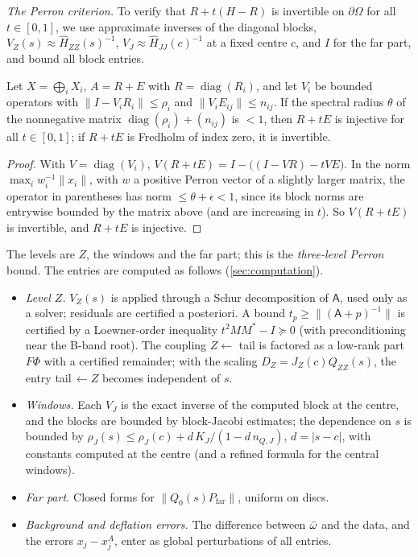 \emph{The Perron criterion.} To verify that $R+t(H-R)$ is invertible on $\partial\Omega$ for all $t\in[0,1]$, we
use approximate inverses of the diagonal blocks, $V_Z(s)\approx\widehat H_{ZZ}(s)^{-1}$, $V_J\approx\widehat
H_{JJ}(c)^{-1}$ at a fixed centre $c$, and $I$ for the far part, and bound all block entries.

\begin{lemma}\label{lem:perron}
Let $X=\bigoplus_iX_i$, $A=R+E$ with $R=\operatorname{diag}(R_i)$, and let $V_i$ be bounded operators with
$\|I-V_iR_i\|\le\rho_i$ and $\|V_iE_{ij}\|\le n_{ij}$. If the spectral radius $\theta$ of the nonnegative matrix
$\operatorname{diag}(\rho_i)+(n_{ij})$ is $<1$, then $R+tE$ is injective for all $t\in[0,1]$; if $R+tE$ is Fredholm of
index zero, it is invertible.
\end{lemma}

\begin{proof}
With $V=\operatorname{diag}(V_i)$, $V(R+tE)=I-\big((I-VR)-tVE\big)$. In the norm
$\max_iw_i^{-1}\|x_i\|$, with $w$ a positive Perron vector of a slightly larger matrix, the operator in
parentheses has norm $\le\theta+\epsilon<1$, since its block norms are entrywise bounded by the matrix above
(and are increasing in $t$). So $V(R+tE)$ is invertible, and $R+tE$ is injective.
\end{proof}

The levels are $Z$, the windows and the far part; this is the \emph{three-level Perron} bound. The entries are
computed as follows (\cref{sec:computation}).
\begin{itemize}[leftmargin=*]
\item \emph{Level $Z$.} $V_Z(s)$ is applied through a Schur decomposition of $\mathsf A$, used
  only as a solver; residuals are certified a posteriori. A bound $t_p\ge\|(\mathsf A+p)^{-1}\|$ is certified by a Loewner-order inequality $t^2MM^*-I\succeq0$ (with preconditioning near the
  B-band root). The coupling $Z\leftarrow$ tail is factored as a low-rank part $F\Phi$ with a certified
  remainder; with the scaling $D_Z=J_Z(c)Q_{ZZ}(s)$, the entry tail$\,\leftarrow Z$ becomes independent of $s$.
\item \emph{Windows.} Each $V_J$ is the exact inverse of the computed block at the centre, and the blocks are
  bounded by block-Jacobi estimates; the dependence on $s$ is bounded by $\rho_J(s)\le\rho_J(c)+d\,K_J/(1-d\,n_{Q,J})$,
  $d=|s-c|$, with constants computed at the centre (and a refined formula for the central windows).
\item \emph{Far part.} Closed forms for $\|Q_0(s)P_{\mathrm{far}}\|$, uniform on discs.
\item \emph{Background and deflation errors.} The difference between $\bar\omega$ and the data, and the errors
  $x_j-x_j^A$, enter as global perturbations of all entries.
\end{itemize}

